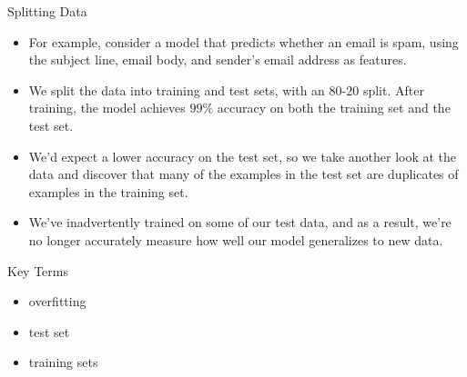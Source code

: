 \documentclass{beamer}
\begin{document}

\begin{frame}{Splitting Data}
\begin{itemize}
\item For example, consider a model that predicts whether an email is spam, using the subject line, email body, and sender's email address as features. 

\medskip
\item We split the data into training and test sets, with an $80$-$20$ split. After training, the model achieves $99\%$ accuracy on both the training set and the test set. 

\medskip
\item We'd expect a lower accuracy on the test set, so we take another look at the data and discover that many of the examples in the test set are duplicates of examples in the training set. 

\medskip
\item We've inadvertently trained on some of our test data, and as a result, we're no longer accurately measure how well our model generalizes to new data.
\end{itemize}
\end{frame}


\begin{frame}{Key Terms}
\begin{itemize}
\item overfitting

\medskip
\item test set

\medskip
\item training sets
\end{itemize}
\end{frame}
\end{document}
